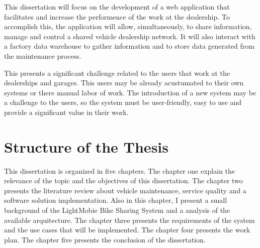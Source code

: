 This dissertation will focus on the development of a web application that facilitates and increase the performence of the work at the dealership.
To accomplish this, the application will allow, simultaneously, to share information, manage and control a shared vehicle dealership network.
It will also interact with a factory data warehouse to gather information and to store data generated from the maintenance process. 

This presents a significant challenge related to the users that work at the dealerships and garages. 
This users may be already acustumated to their own systems or there manual labor of work.  
The introduction of a new system may be a challenge to the users, so the system must be user-friendly, easy to use and provide a significant value in their work.

\section{Structure of the Thesis}

This dissertation is organized in five chapters. The chapter one explain the relevance of the topic and the objectives of this dissertation.
The chapter two presents the literature review about vehicle maintenance, service quality and a software solution implementation. 
Also in this chapter, I present a small background of the LightMobie Bike Sharing System and a analysis of the available arquitecture.
The chapter three presents the requirements of the system and the use cases that will be implemented.
The chapter four presents the work plan.
The chapter five presents the conclusion of the dissertation. 

